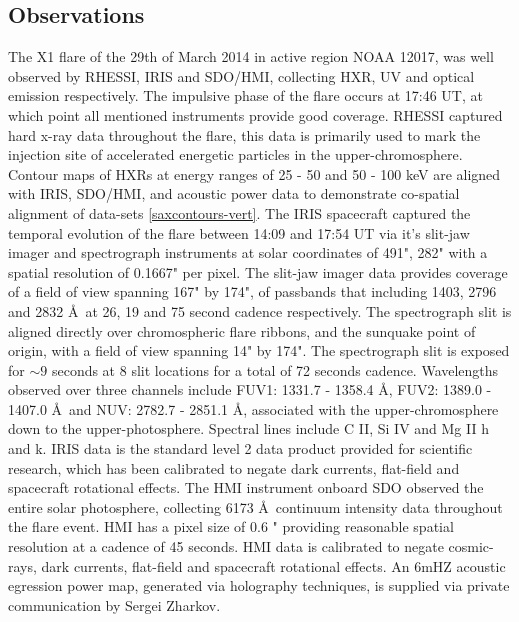 \subsection{Observations}
The X1 flare of the 29th of March 2014 in active region NOAA 12017, was well observed by RHESSI, IRIS and SDO/HMI, collecting HXR, UV and optical emission respectively. The impulsive phase of the flare occurs at 17:46 UT, at which point all mentioned instruments provide good coverage. RHESSI captured hard x-ray data throughout the flare, this data is primarily used to mark the injection site of accelerated energetic particles in the upper-chromosphere. Contour maps of HXRs at energy ranges of 25 - 50 and 50 - 100 keV are aligned with IRIS, SDO/HMI, and acoustic power data to demonstrate co-spatial alignment of data-sets \ref{saxcontours-vert}. The IRIS spacecraft captured the temporal evolution of the flare between 14:09 and 17:54 UT via it's slit-jaw imager and spectrograph instruments at solar coordinates of 491", 282" with a spatial resolution of 0.1667" per pixel. The slit-jaw imager data provides coverage of a field of view spanning 167" by 174", of passbands that including 1403, 2796 and 2832 \AA\ at 26, 19 and 75 second cadence respectively. The spectrograph slit is aligned directly over chromospheric flare ribbons, and the sunquake point of origin, with a field of view spanning 14" by 174". The spectrograph slit is exposed for $\sim9$ seconds at 8 slit locations for a total of 72 seconds cadence. Wavelengths observed over three channels include FUV1: 1331.7 - 1358.4 \AA, FUV2: 1389.0 - 1407.0 \AA\ and NUV: 2782.7 - 2851.1 \AA, associated with the upper-chromosphere down to the upper-photosphere. Spectral lines include C II, Si IV and Mg II h and k. IRIS data is the standard level 2 data product provided for scientific research, which has been calibrated to negate dark currents, flat-field and spacecraft rotational effects. The HMI instrument onboard SDO observed the entire solar photosphere, collecting 6173 \AA\ continuum intensity data throughout the flare event. HMI has a pixel size of 0.6 " providing reasonable spatial resolution at a cadence of 45 seconds. HMI data is calibrated to negate cosmic-rays, dark currents, flat-field and spacecraft rotational effects. An 6mHZ acoustic egression power map, generated via holography techniques, is supplied via private communication by Sergei Zharkov.

